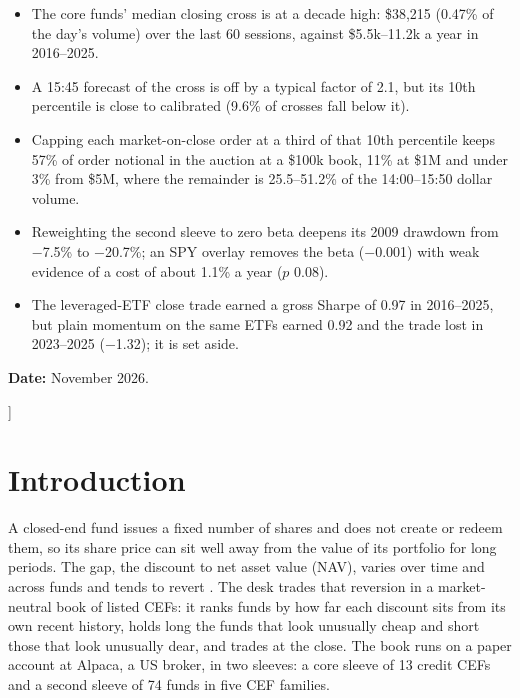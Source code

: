 \documentclass[10pt, a4paper, twocolumn]{article}
\newenvironment{keyfindings}
  {\begin{tcolorbox}[enhanced, colback=qbox, colframe=qnavy, boxrule=0pt, leftrule=2.5pt,
     arc=0pt, left=6pt, right=6pt, top=4pt, bottom=4pt, fontupper=\small,
     title={\small\bfseries Key findings}, coltitle=qnavy, colbacktitle=qbox, attach title to upper={\par\vspace{2pt}}]
   \begin{itemize}[nosep, leftmargin=*, label={\color{qnavy}\textbullet}]}
  {\end{itemize}\end{tcolorbox}}
\begin{document}
{\begin{center}
\begin{minipage}{0.92\textwidth}
\upshape
\begin{keyfindings}
\item The core funds' median closing cross is at a decade high: \$38,215 (0.47\% of the day's volume) over the last 60 sessions, against \$5.5k--11.2k a year in 2016--2025.
\item A 15:45 forecast of the cross is off by a typical factor of 2.1, but its 10th percentile is close to calibrated (9.6\% of crosses fall below it).
\item Capping each market-on-close order at a third of that 10th percentile keeps 57\% of order notional in the auction at a \$100k book, 11\% at \$1M and under 3\% from \$5M, where the remainder is 25.5--51.2\% of the 14:00--15:50 dollar volume.
\item Reweighting the second sleeve to zero beta deepens its 2009 drawdown from $-$7.5\% to $-$20.7\%; an SPY overlay removes the beta ($-$0.001) with weak evidence of a cost of about 1.1\% a year ($p$ 0.08).
\item The leveraged-ETF close trade earned a gross Sharpe of 0.97 in 2016--2025, but plain momentum on the same ETFs earned 0.92 and the trade lost in 2023--2025 ($-$1.32); it is set aside.
\end{keyfindings}
\end{minipage}

\vspace{0.3em}
{\footnotesize \textbf{Date:} November 2026.}
\end{center}
\vspace{1em}
}]

\section{Introduction}
\label{sec:intro}

A closed-end fund issues a fixed number of shares and does not create or redeem them, so its share price can sit well away from the value of its portfolio for long periods. The gap, the discount to net asset value (NAV), varies over time and across funds and tends to revert \cite{lee1991,pontiff1995,pontiff1996}. The desk trades that reversion in a market-neutral book of listed CEFs: it ranks funds by how far each discount sits from its own recent history, holds long the funds that look unusually cheap and short those that look unusually dear, and trades at the close. The book runs on a paper account at Alpaca, a US broker, in two sleeves: a core sleeve of 13 credit CEFs and a second sleeve of 74 funds in five CEF families.
\end{document}
